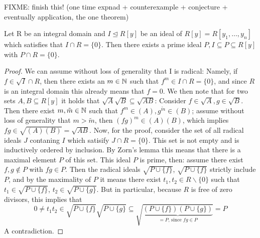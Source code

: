 FIXME: finish this! (one time expnad + counterexample + conjecture + eventually application, the one theorem)

\begin{lem}\label{primeoverp1}
Let R be an integral domain and $I \unlhd R[y]$ be an ideal of $R[y] = R[y_1,\ldots,y_n]$ which satisfies that $I \cap R = \{ 0 \}$.
Then there exists a prime ideal $P, I \subseteq P \subseteq R[y] $ with $P \cap R = \{0\}$.
\begin{proof}
We can assume without loss of generality that I is radical:
Namely, if $f \in \sqrt{I} \cap R$, then there exists an $m \in \mathbb{N}$ such that $f^m \in I \cap R = \{0\}$, and since $R$ is an integral domain this already means that $f = 0$.
We then note that for two sets $A,B \subseteq R[y]$ it holds that $\sqrt{A}\sqrt{B} \subseteq \sqrt{AB}$: Consider $f \in \sqrt{A}, g \in \sqrt{B}$. Then there exist $m, \tilde m \in \mathbb{N}$ such that $f^m \in (A), g^{\tilde m} \in (B)$;
 assume without loss of generality that $m > \tilde m$, then $(fg)^m \in (A)(B)$, which implies $fg \in \sqrt{(A)(B)} = \sqrt{AB}$.
Now, for the proof, consider the set of all radical ideals $J$ contaning $I$ which satisify $J \cap R = \{0\}$. This set is not empty and is inductively ordered by inclusion.
By Zorn's lemma this means that there is a maximal element $P$ of this set. This ideal $P$ is prime, then: assume there exist $f,g \notin P$ with $fg \in P$. 
Then the radical ideals $\sqrt{P \cup \{f\}}$, $\sqrt{P \cup \{f\}}$ strictly include $P$, and by the maximality of $P$ it means there exist $t_1, t_2 \in R\backslash\{0\}$ such that
$t_1 \in \sqrt{P \cup \{f\}}$, $t_2 \in \sqrt{P \cup \{g\}}$. But in particular, because $R$ is free of zero divisors, this implies that
 \[0 \neq t_1t_2 \in \sqrt{P \cup \{f\}}\sqrt{P \cup \{g\}} \subseteq \sqrt{ \underbrace{(P \cup \{f\})(P \cup \{g\})}_{=P\text{, since }fg \in P}} = P\]
A contradiction.
\end{proof}
\end{lem}


